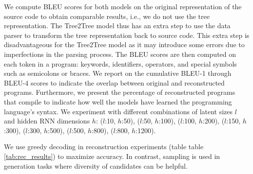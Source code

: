 We compute BLEU scores \cite{papineni2002bleu} for both models on the original representation of the source code to obtain comparable results, i.e., we do not use the tree representation. The Tree2Tree model thus has an extra step to use the data parser to transform the tree representation back to source code. This extra step is disadvantageous for the Tree2Tree model as it may introduce some errors due to imperfections in the parsing process. The BLEU scores are then computed on each token in a program: keywords, identifiers, operators, and special symbols such as semicolons or braces. We report on the cumulative BLEU-1 through BLEU-4 scores to indicate the overlap between original and reconstructed programs. Furthermore, we present the percentage of reconstructed programs that compile to indicate how well the models have learned the programming language's syntax. We experiment with different combinations of latent sizes $l$ and hidden RNN dimensions $h$:  ($l$:10,  $h$:50), ($l$:50, $h$:100), ($l$:100, $h$:200), ($l$:150, $h$:300), ($l$:300, $h$:500), ($l$:500, $h$:800), ($l$:800, $h$:1200).



We use greedy decoding in reconstruction experiments (table table \ref{tab:rec_results}) to maximize accuracy. In contrast, sampling is used in generation tasks where diversity of candidates can be helpful.


